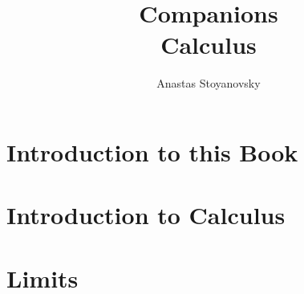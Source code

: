 \documentclass[10pt]{book}
\title{Companions\\
Calculus}
\author{Anastas Stoyanovsky}
\begin{document}
\maketitle
\tableofcontents


\chapter{Introduction to this Book}


\chapter{Introduction to Calculus}


\chapter{Limits}

\end{document}
